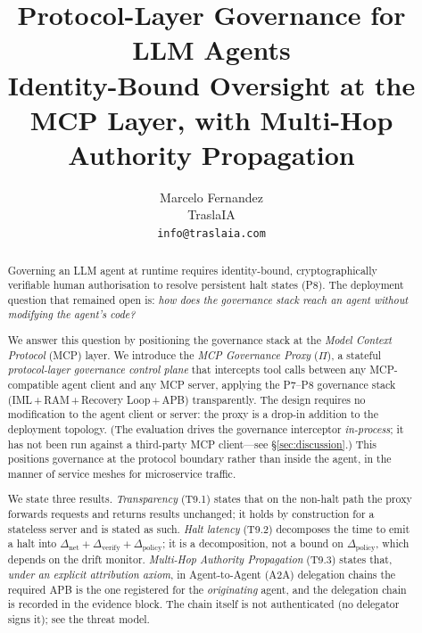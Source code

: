 \documentclass[11pt]{article}
\title{\textbf{Protocol-Layer Governance for LLM Agents}\\[4pt]
       \large Identity-Bound Oversight at the MCP Layer,
       with Multi-Hop Authority Propagation}
\author{Marcelo Fernandez\\
        \small TraslaIA\\
        \small \texttt{info@traslaia.com}}
\date{}
\newcommand{\Proxy}{\Pi}
\newcommand{\Dnet}{\Delta_{\mathrm{net}}}
\newcommand{\Dverify}{\Delta_{\mathrm{verify}}}
\newcommand{\Dpolicy}{\Delta_{\mathrm{policy}}}
\begin{document}
\maketitle

\begin{abstract}
\noindent
Governing an LLM agent at runtime requires identity-bound,
cryptographically verifiable human authorisation to resolve persistent
halt states (P8). The deployment question that remained open is:
\emph{how does the governance stack reach an agent without modifying
the agent's code?}

We answer this question by positioning the governance stack at the
\emph{Model Context Protocol} (MCP) layer.
We introduce the \emph{MCP Governance Proxy} ($\Proxy$), a stateful
\emph{protocol-layer governance control plane} that intercepts tool
calls between any MCP-compatible agent client and any MCP server,
applying the P7--P8 governance stack
(IML\,+\,RAM\,+\,Recovery Loop\,+\,APB) transparently.
The design requires no modification to the agent client or server: the
proxy is a drop-in addition to the deployment topology. (The evaluation
drives the governance interceptor \emph{in-process}; it has not been run
against a third-party MCP client---see \S\ref{sec:discussion}.)
This positions governance at the protocol boundary rather than inside
the agent, in the manner of service meshes for microservice traffic.

We state three results.
\emph{Transparency} (T9.1) states that on the non-halt
path the proxy forwards requests and returns results unchanged; it
holds by construction for a stateless server and is stated as such.
\emph{Halt latency} (T9.2) decomposes the time to emit a halt into
$\Dnet + \Dverify + \Dpolicy$; it is a decomposition, not a bound on
$\Dpolicy$, which depends on the drift monitor. \emph{Multi-Hop
Authority Propagation} (T9.3) states that, \emph{under an explicit
attribution axiom}, in Agent-to-Agent (A2A) delegation chains the
required APB is the one registered for the \emph{originating} agent,
and the delegation chain is recorded in the evidence block. The chain
itself is not authenticated (no delegator signs it); see the threat
model.


\end{abstract}
\end{document}
